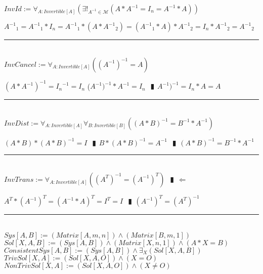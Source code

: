 \documentclass{book}
\newcommand{\abr}{:=}
\newcommand{\pipe}{$\phantom{(}\vrectangleblack\phantom{)}$}
\newcommand{\pr}[1]{\left(#1\right)}
\begin{document}
$InvId \abr \forall_{A : Invertible[A]}\pr{\exists!_{A^{-1} \in \mathcal{M}}(A * A^{-1} = I_n = A^{-1} * A)}$
\begin{enumerate}
  \lit ${A^{-1}}_{1} = {A^{-1}}_{1} * I_n = {A^{-1}}_{1} * (A * {A^{-1}}_{2}) = ({A^{-1}}_{1} * A) * {A^{-1}}_{2} = I_n * {A^{-1}}_{2} = {A^{-1}}_{2}$
\end{enumerate} \vspace{.75mm} \hrule \vspace{.75mm} \ \\ 

$InvCancel \abr \forall_{A : Invertible[A]}\pr{(A^{-1})^{-1} = A}$
\begin{enumerate}
  \lit $(A * A^{-1})^{-1} = {I_n}^{-1} = I_n$
  \lit ($A^{-1})^{-1} * A^{-1} = I_n$ \pipe $A^{-1})^{-1} = I_n * A = A$
\end{enumerate} \vspace{.75mm} \hrule \vspace{.75mm} \ \\ 

$InvDist \abr \forall_{A : Invertible[A]} \forall_{B : Invertible[B]}\pr{(A * B)^{-1} = B^{-1} * A^{-1}}$
\begin{enumerate}
  \lit $(A * B) * (A * B)^{-1} = I$ \pipe $B * (A * B)^{-1} = A^{-1}$ \pipe $(A * B)^{-1} = B^{-1} * A^{-1}$
\end{enumerate} \vspace{.75mm} \hrule \vspace{.75mm} \ \\ 

$InvTrans \abr \forall_{A : Invertible[A]}\pr{(A^T)^{-1} = (A^{-1})^T}$ \pipe $\Leftarrow$
\begin{enumerate}
  \lit $A^T * (A^{-1})^T = (A^{-1} * A)^T = I^T = I$ \pipe $(A^{-1})^T = (A^T)^{-1}$
\end{enumerate} \vspace{.75mm} \hrule \vspace{.75mm} \ \\ 

$Sys[A, B] \abr (Matrix[A, m, n]) \land (Matrix[B, m, 1])$ \\
$Sol[X, A, B] \abr (Sys[A, B]) \land (Matrix[X, n, 1]) \land (A * X = B)$ \\
$ConsistentSys[A, B] \abr (Sys[A, B]) \land \exists_{X}(Sol[X, A, B])$ \\
$TrivSol[X, A] \abr (Sol[X, A, O]) \land (X = O)$ \\
$NonTrivSol[X, A] \abr (Sol[X, A, O]) \land (X \neq O)$ \\
\end{document}
